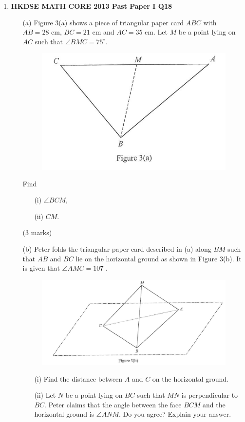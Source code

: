 \documentclass[12pt]{article}
\begin{document}
\begin{enumerate}
	\item \textbf{HKDSE MATH CORE 2013 Past Paper I Q18}
	\begin{enumerate}
		\item[(a)] Figure 3(a) shows a piece of triangular paper card $ABC$ with $AB = 28$ cm, $BC = 21$ cm and $AC = 35$ cm. Let $M$ be a point lying on $AC$ such that $\angle BMC = 75^\circ$.
		\begin{figure}[H]
			\centering
			\includegraphics[width = .3\linewidth]{2013Figure1.3a}
		\end{figure}
		Find
		\begin{enumerate}
			\item[(i)] $\angle BCM$,
			\item[(ii)] $CM$.
		\end{enumerate}
		(3 marks)
		\item[(b)] Peter folds the triangular paper card described in (a) along $BM$ such that $AB$ and $BC$ lie on the horizontal ground as shown in Figure 3(b). It is given that $\angle AMC = 107^\circ$.
		\begin{figure}[H]
			\centering
			\includegraphics[width = .3\linewidth]{2013Figure1.3b}
		\end{figure}
		\begin{enumerate}
			\item[(i)] Find the distance between $A$ and $C$ on the horizontal ground.
			\item[(ii)] Let $N$ be a point lying on $BC$ such that $MN$ is perpendicular to $BC$. Peter claims that the angle between the face $BCM$ and the horizontal ground is $\angle ANM$. Do you agree? Explain your answer.
		\end{enumerate}
	\end{enumerate}


\end{enumerate}
\end{document}
